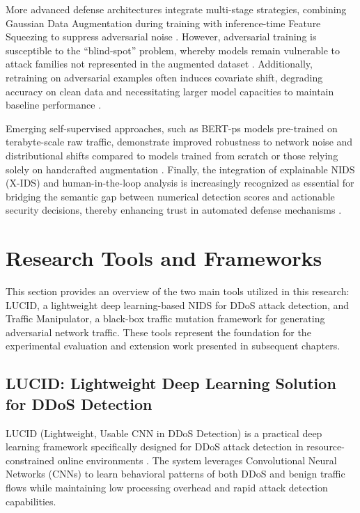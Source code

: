 More advanced defense architectures integrate multi-stage strategies, combining Gaussian Data Augmentation during training with inference-time Feature Squeezing to suppress adversarial noise \cite{roshan2024boosting}. 
However, adversarial training is susceptible to the ``blind-spot'' problem, whereby models remain vulnerable to attack families not represented in the augmented dataset \cite{vitorino2023sok}. 
Additionally, retraining on adversarial examples often induces covariate shift, degrading accuracy on clean data and necessitating larger model capacities to maintain baseline performance \cite{ye2019adversarial}.

Emerging self-supervised approaches, such as BERT-ps models pre-trained on terabyte-scale raw traffic, demonstrate improved robustness to network noise and distributional shifts compared to models trained from scratch or those relying solely on handcrafted augmentation \cite{yang2025robustness}. 
Finally, the integration of explainable NIDS (X-IDS) and human-in-the-loop analysis is increasingly recognized as essential for bridging the semantic gap between numerical detection scores and actionable security decisions, thereby enhancing trust in automated defense mechanisms \cite{wei2023xnids}.

\section{Research Tools and Frameworks}

This section provides an overview of the two main tools utilized in this research: LUCID, a lightweight deep learning-based NIDS for DDoS attack detection, and Traffic Manipulator, a black-box traffic mutation framework for generating adversarial network traffic. These tools represent the foundation for the experimental evaluation and extension work presented in subsequent chapters.

\subsection{LUCID: Lightweight Deep Learning Solution for DDoS Detection}

LUCID (Lightweight, Usable CNN in DDoS Detection) is a practical deep learning framework specifically designed for DDoS attack detection in resource-constrained online environments \cite{doriguzzi2020lucid}. The system leverages Convolutional Neural Networks (CNNs) to learn behavioral patterns of both DDoS and benign traffic flows while maintaining low processing overhead and rapid attack detection capabilities.


